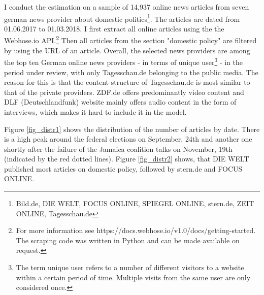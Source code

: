 \documentclass[12pt,a4paper,notitlepage]{article}
\begin{document}
I conduct the estimation on a sample of 14,937 online news articles from seven german news provider about domestic politics\footnote{Bild.de, DIE WELT, FOCUS ONLINE, SPIEGEL ONLINE, stern.de, ZEIT ONLINE, Tagesschau.de}.  The articles are dated from 01.06.2017 to 01.03.2018. I first extract all online articles using the the Webhose.io API.\footnote{For more information see https://docs.webhose.io/v1.0/docs/getting-started. The scraping code was written in Python and can be made available on request.} Then all articles from the section "domestic policy" are filtered by using the URL of an article. Overall, the selected news providers are among the top ten German online news providers - in terms of unique user\footnote{The term unique user refers to a number of different visitors to a website within a certain period of time. Multiple visits from the same user are only considered once.} - in the period under review, with only Tagesschau.de belonging to the public media. The reason for this is that the content structure of Tagesschau.de is most similar to that of the private providers. ZDF.de offers predominantly video content and DLF (Deutschlandfunk) website mainly offers audio content in the form of interviews, which makes it hard to include it in the model. 

 Figure \ref{fig_distr1} shows the distribution of the number of articles by date. There is a high peak around the federal elections on September, 24th and another one shortly after the failure of the Jamaica coalition talks on November, 19th (indicated by the red dotted lines). Figure \ref{fig_distr2} shows, that DIE WELT published most articles on domestic policy, followed by stern.de and FOCUS ONLINE.  
\end{document}
